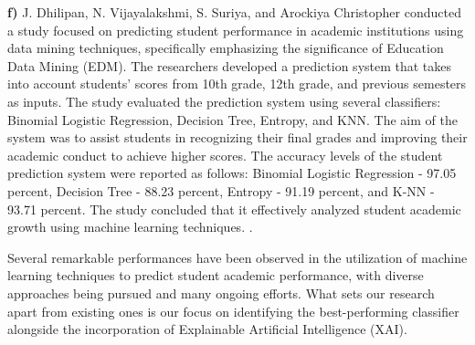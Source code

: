 \documentclass[conference]{IEEEtran}
\begin{document}
\textbf{f)} J. Dhilipan, N. Vijayalakshmi, S. Suriya, and Arockiya Christopher conducted a study focused on predicting student performance in academic institutions using data mining techniques, specifically emphasizing the significance of Education Data Mining (EDM). The researchers developed a prediction system that takes into account students' scores from 10th grade, 12th grade, and previous semesters as inputs.
The study evaluated the prediction system using several classifiers: Binomial Logistic Regression, Decision Tree, Entropy, and KNN. The aim of the system was to assist students in recognizing their final grades and improving their academic conduct to achieve higher scores. 
The accuracy levels of the student prediction system were reported as follows: Binomial Logistic Regression - 97.05 percent, Decision Tree - 88.23 percent, Entropy - 91.19 percent, and K-NN - 93.71 percent. The study concluded that it effectively analyzed student academic growth using machine learning techniques. \cite{r9}.\par
\vspace{3mm}
Several remarkable performances have been observed in the utilization of machine learning techniques to predict student academic performance, with diverse approaches being pursued and many ongoing efforts. What sets our research apart from existing ones is our focus on identifying the best-performing classifier alongside the incorporation of Explainable Artificial Intelligence (XAI).
\end{document}
